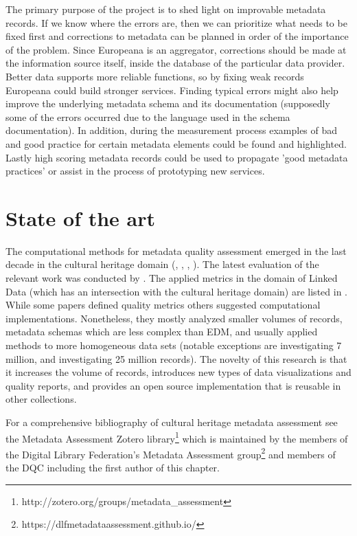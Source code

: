 The primary purpose of the project is to shed light on improvable metadata records. If we know where the errors are, then we can prioritize what needs to be fixed first and corrections to metadata can be planned in order of the importance of the problem. Since Europeana is an aggregator, corrections should be made at the information source itself, inside the database of the particular data provider. Better data supports more reliable functions, so by fixing weak records Europeana could build stronger services. Finding typical errors might also help improve the underlying metadata schema and its documentation (supposedly some of the errors occurred due to the language used in the schema documentation).  In addition, during the measurement process examples of bad and good practice for certain metadata elements could be found and highlighted. Lastly high scoring metadata records could be used to propagate 'good metadata practices' or assist in the process of prototyping new services.

\section{State of the art}

The computational methods for metadata quality assessment emerged in the last decade in the cultural heritage domain (\cite{bruce-hillmann2004}, \cite{stvilia2007}, \cite{ochoa-duval2009}, \cite{harper2016}). The latest evaluation of the relevant work was conducted by \cite{palavitsinis2014}. The applied metrics in the domain of Linked Data (which has an intersection with the cultural heritage domain) are listed in \cite{zaveri2015}. While some papers defined quality metrics others suggested computational implementations. Nonetheless, they mostly analyzed smaller volumes of records, metadata schemas which are less complex than EDM, and usually applied methods to more homogeneous data sets (notable exceptions are \cite{newman2007} investigating 7 million, and \cite{harper2016} investigating 25 million records). The novelty of this research is that it increases the volume of records, introduces new types of data visualizations and quality reports, and provides an open source implementation that is reusable in other collections.

For a comprehensive bibliography of cultural heritage metadata assessment see the Metadata Assessment Zotero library\footnote{http://zotero.org/groups/metadata\_assessment} which is maintained by the members of the Digital Library Federation’s Metadata Assessment group\footnote{https://dlfmetadataassessment.github.io/} and members of the DQC including the first author of this chapter.

